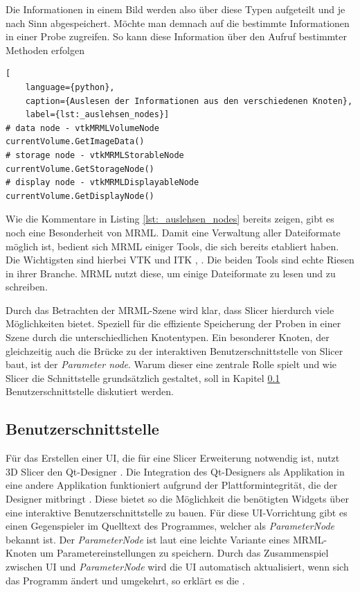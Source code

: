 Die Informationen in einem Bild werden also über diese Typen aufgeteilt und je
nach Sinn abgespeichert. Möchte man demnach auf die bestimmte Informationen in einer
Probe zugreifen. So kann diese Information über den Aufruf bestimmter Methoden
erfolgen

\begin{lstlisting}[
	language={python},
	caption={Auslesen der Informationen aus den verschiedenen Knoten},
	label={lst:_auslehsen_nodes}]
# data node - vtkMRMLVolumeNode
currentVolume.GetImageData()
# storage node - vtkMRMLStorableNode
currentVolume.GetStorageNode()
# display node - vtkMRMLDisplayableNode
currentVolume.GetDisplayNode()
\end{lstlisting}

Wie die Kommentare in Listing \ref{lst:_auslehsen_nodes} bereits zeigen, gibt es
noch eine Besonderheit von \ac{MRML}. Damit eine Verwaltung aller Dateiformate möglich
ist, bedient sich \ac{MRML} einiger Tools, die sich bereits etabliert haben. Die
Wichtigsten sind hierbei \ac{VTK} und \ac{ITK} \citep[vgl.][K.~1.1]{vtk2006}, \citep[vgl.][K.~1.1]{itkguide2015}.
Die beiden Tools sind echte Riesen in ihrer Branche. \ac{MRML} nutzt diese, um
einige Dateiformate zu lesen und zu schreiben.

Durch das Betrachten der \ac{MRML}-Szene wird klar, dass Slicer hierdurch viele
Möglichkeiten bietet. Speziell für die effiziente Speicherung der Proben in einer
Szene durch die unterschiedlichen Knotentypen. Ein besonderer Knoten, der gleichzeitig
auch die Brücke zu der interaktiven Benutzerschnittstelle von Slicer baut, ist
der \textit{Parameter node}. Warum dieser eine zentrale Rolle spielt und wie
Slicer die Schnittstelle grundsätzlich gestaltet, soll in Kapitel \ref{subsec:benutzerschnitstelle}
Benutzerschnittstelle diskutiert werden.

\subsection{Benutzerschnittstelle}
\label{subsec:benutzerschnitstelle} Für das Erstellen einer \ac{UI}, die für eine
Slicer Erweiterung notwendig ist, nutzt 3D Slicer den Qt-Designer \citep[vgl.][Ab.~Einführung]{qt2024}.
Die Integration des Qt-Designers als Applikation in eine andere Applikation
funktioniert aufgrund der Plattformintegrität, die der Designer mitbringt \citep[vgl.][Ab.~Einführung]{qt2024}.
Diese bietet so die Möglichkeit die benötigten Widgets über eine interaktive Benutzerschnittstelle
zu bauen. Für diese \ac{UI}-Vorrichtung gibt es einen Gegenspieler im Quelltext des
Programmes, welcher als \textit{ParameterNode} bekannt ist. Der \textit{ParameterNode}
ist laut \citet{slicer2024} eine leichte Variante eines \ac{MRML}-Knoten um Parametereinstellungen
zu speichern. Durch das Zusammenspiel zwischen \ac{UI} und \textit{ParameterNode}
wird die \ac{UI} automatisch aktualisiert, wenn sich das Programm ändert und
umgekehrt, so erklärt es die \citet{slicer2024}.

